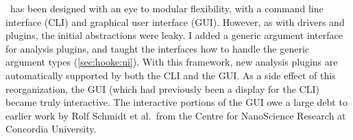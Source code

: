 \Hooke\ has been designed with an eye to modular flexibility, with a
command line interface (CLI) and graphical user interface (GUI).
However, as with drivers and plugins, the initial abstractions were
leaky.  I added a generic argument interface for analysis plugins, and
taught the interfaces how to handle the generic argument types
(\cref{sec:hooke:ui}).  With this framework, new analysis plugins are
automatically supported by both the CLI and the GUI.  As a side effect
of this reorganization, the GUI (which had previously been a display
for the CLI) became truly interactive.  The interactive portions of
the GUI owe a large debt to earlier work by Rolf Schmidt et al.~from
the Centre for NanoScience Research at Concordia University.
%
